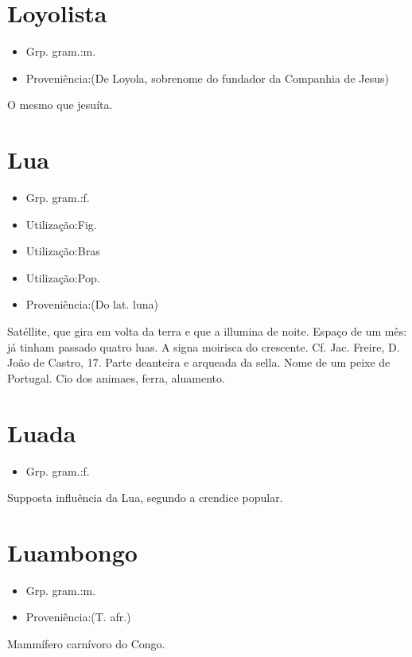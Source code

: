 \section{Loyolista}
\begin{itemize}
\item {Grp. gram.:m.}
\end{itemize}
\begin{itemize}
\item {Proveniência:(De \textunderscore Loyola\textunderscore , sobrenome do fundador da Companhia de Jesus)}
\end{itemize}
O mesmo que \textunderscore jesuíta\textunderscore .
\section{Lua}
\begin{itemize}
\item {Grp. gram.:f.}
\end{itemize}
\begin{itemize}
\item {Utilização:Fig.}
\end{itemize}
\begin{itemize}
\item {Utilização:Bras}
\end{itemize}
\begin{itemize}
\item {Utilização:Pop.}
\end{itemize}
\begin{itemize}
\item {Proveniência:(Do lat. \textunderscore luna\textunderscore )}
\end{itemize}
Satéllite, que gira em volta da terra e que a illumina de noite.
Espaço de um mês: \textunderscore já tinham passado quatro luas\textunderscore .
A signa moirisca do crescente. Cf. Jac. Freire, \textunderscore D. João de Castro\textunderscore , 17.
Parte deanteira e arqueada da sella.
Nome de um peixe de Portugal.
Cio dos animaes, ferra, aluamento.
\section{Luada}
\begin{itemize}
\item {Grp. gram.:f.}
\end{itemize}
Supposta influência da Lua, segundo a crendice popular.
\section{Luambongo}
\begin{itemize}
\item {Grp. gram.:m.}
\end{itemize}
\begin{itemize}
\item {Proveniência:(T. afr.)}
\end{itemize}
Mammífero carnívoro do Congo.
